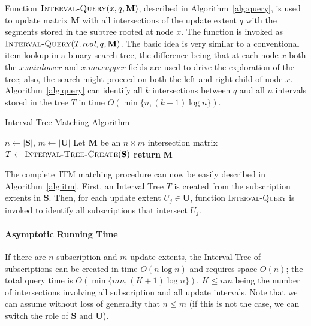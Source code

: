 \documentclass[10pt, conference, compsocconf]{IEEEtran}
\begin{document}
Function $\textsc{Interval-Query}(x, q, \mathbf{M})$, described in
Algorithm~\ref{alg:query}, is used to update matrix $\mathbf{M}$ with
all intersections of the update extent $q$ with the segments stored in
the subtree rooted at node $x$. The function is invoked as
$\textsc{Interval-Query}(T.\textit{root}, q, \mathbf{M})$. The basic
idea is very similar to a conventional item lookup in a binary search
tree, the difference being that at each node $x$ both the
$x.\textit{minlower}$ and $x.\textit{maxupper}$ fields are used to
drive the exploration of the tree; also, the search might proceed on
both the left and right child of node $x$. Algorithm~\ref{alg:query}
can identify all $k$ intersections between $q$ and all $n$ intervals
stored in the tree $T$ in time $O\left(\min\{n, (k+1) \log
n\}\right)$.

\begin{algorithm}[t]
\caption{Interval Tree Matching Algorithm}\label{alg:itm}
\begin{algorithmic}
\State $n \gets |\mathbf{S}|$, $m \gets |\mathbf{U}|$
\State Let $\mathbf{M}$ be an $n \times m$ intersection matrix
\State $T \gets \textsc{Interval-Tree-Create}(\mathbf{S})$
\State {}
\EndFor
\State \textbf{return} $\mathbf{M}$
\EndFunction
\end{algorithmic}
\end{algorithm}

The complete~\ac{ITM} matching procedure can now be easily described
in Algorithm~\ref{alg:itm}. First, an Interval Tree $T$ is created
from the subscription extents in $\mathbf{S}$.  Then, for each update
extent $U_j \in \mathbf{U}$, function \textsc{Interval-Query} is
invoked to identify all subscriptions that intersect $U_j$.

\paragraph*{Asymptotic Running Time} If there are
$n$ subscription and $m$ update extents, the Interval Tree of
subscriptions can be created in time $O(n \log n)$ and requires space
$O(n)$; the total query time is $O\left( \min\{mn, (K+1) \log
n\}\right)$, $K \leq nm$ being the number of intersections involving
all subscription and all update intervals. Note that we can assume
without loss of generality that $n \leq m$ (if this is not the case,
we can switch the role of $\mathbf{S}$ and $\mathbf{U}$).
\end{document}
